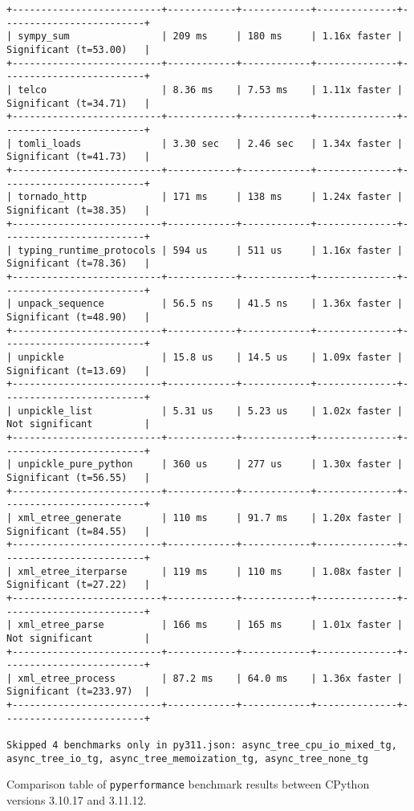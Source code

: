\begin{code}
\begin{verbatim}
+--------------------------+------------+------------+--------------+-------------------------+
| sympy_sum                | 209 ms     | 180 ms     | 1.16x faster | Significant (t=53.00)   |
+--------------------------+------------+------------+--------------+-------------------------+
| telco                    | 8.36 ms    | 7.53 ms    | 1.11x faster | Significant (t=34.71)   |
+--------------------------+------------+------------+--------------+-------------------------+
| tomli_loads              | 3.30 sec   | 2.46 sec   | 1.34x faster | Significant (t=41.73)   |
+--------------------------+------------+------------+--------------+-------------------------+
| tornado_http             | 171 ms     | 138 ms     | 1.24x faster | Significant (t=38.35)   |
+--------------------------+------------+------------+--------------+-------------------------+
| typing_runtime_protocols | 594 us     | 511 us     | 1.16x faster | Significant (t=78.36)   |
+--------------------------+------------+------------+--------------+-------------------------+
| unpack_sequence          | 56.5 ns    | 41.5 ns    | 1.36x faster | Significant (t=48.90)   |
+--------------------------+------------+------------+--------------+-------------------------+
| unpickle                 | 15.8 us    | 14.5 us    | 1.09x faster | Significant (t=13.69)   |
+--------------------------+------------+------------+--------------+-------------------------+
| unpickle_list            | 5.31 us    | 5.23 us    | 1.02x faster | Not significant         |
+--------------------------+------------+------------+--------------+-------------------------+
| unpickle_pure_python     | 360 us     | 277 us     | 1.30x faster | Significant (t=56.55)   |
+--------------------------+------------+------------+--------------+-------------------------+
| xml_etree_generate       | 110 ms     | 91.7 ms    | 1.20x faster | Significant (t=84.55)   |
+--------------------------+------------+------------+--------------+-------------------------+
| xml_etree_iterparse      | 119 ms     | 110 ms     | 1.08x faster | Significant (t=27.22)   |
+--------------------------+------------+------------+--------------+-------------------------+
| xml_etree_parse          | 166 ms     | 165 ms     | 1.01x faster | Not significant         |
+--------------------------+------------+------------+--------------+-------------------------+
| xml_etree_process        | 87.2 ms    | 64.0 ms    | 1.36x faster | Significant (t=233.97)  |
+--------------------------+------------+------------+--------------+-------------------------+

Skipped 4 benchmarks only in py311.json: async_tree_cpu_io_mixed_tg, async_tree_io_tg, async_tree_memoization_tg, async_tree_none_tg
    \end{verbatim}
    \caption{Comparison table of \texttt{pyperformance} benchmark results between CPython versions 3.10.17 and 3.11.12.}
    \label{listing:pyperformance-results-310-311}
\end{code}

